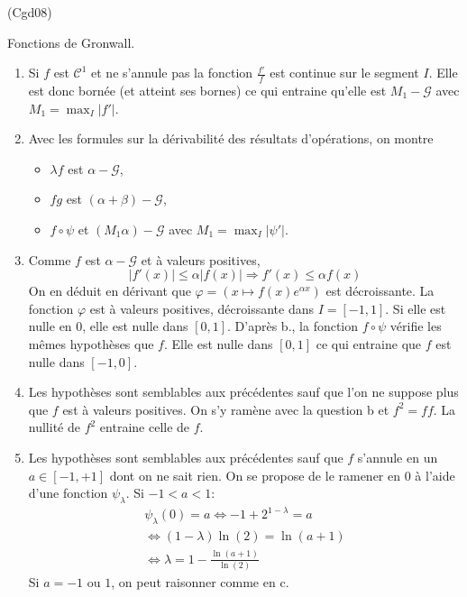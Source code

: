 \begin{tiny}(Cgd08)\end{tiny} Fonctions de Gronwall.
\begin{enumerate}
  \item Si $f$ est $\mathcal{C}^1$ et ne s'annule pas la fonction $\frac{f'}{f}$ est continue sur le segment $I$. Elle est donc bornée (et atteint ses bornes) ce qui entraine qu'elle est $M_1-\mathcal{G}$ avec $M_1 = \max_{I}|f'|$.
  \item Avec les formules sur la dérivabilité des résultats d'opérations, on montre
\begin{itemize}
 \item $\lambda f$ est $\alpha-\mathcal{G}$,
 \item $fg$ est $(\alpha + \beta)-\mathcal{G}$,
 \item $f\circ \psi$ et $(M_1\alpha)-\mathcal{G}$ avec $M_1 = \max_{I}|\psi'|$.
\end{itemize}

  \item Comme $f$ est $\alpha - \mathcal{G}$ et à valeurs positives,
\[
 |f'(x)|\leq \alpha |f(x)| \Rightarrow f'(x)\leq \alpha f(x)
\]
On en déduit en dérivant que $\varphi = \left( x\mapsto f(x)e^{\alpha x}\right) $ est décroissante. La fonction $\varphi$ est à valeurs positives, décroissante dans $I = \left[ -1,1\right] $. Si elle est nulle en $0$, elle est nulle dans $[0,1]$.\newline
D'après b., la fonction $f\circ \psi$ vérifie les mêmes hypothèses que $f$. Elle est nulle dans $[0,1]$ ce qui entraine que $f$ est nulle dans $[-1,0]$.
  \item Les hypothèses sont semblables aux précédentes sauf que l'on ne suppose plus que $f$ est à valeurs positives. On s'y ramène avec la question b et $f^2 = f f$. La nullité de $f^2$ entraine celle de $f$.
  
  \item Les hypothèses sont semblables aux précédentes sauf que $f$ s'annule en un $a\in \left[ -1, +1 \right]$ dont on ne sait rien. On se propose de le ramener en $0$ à l'aide d'une fonction $\psi_\lambda$. \newline
Si $-1 < a < 1$:
\begin{multline*}
\psi_\lambda(0) = a 
\Leftrightarrow 
-1 + 2^{1-\lambda} = a \\
\Leftrightarrow
(1-\lambda)\ln(2) = \ln(a+1)\\
\Leftrightarrow
\lambda = 1 - \frac{\ln(a+1)}{\ln(2)}
\end{multline*}
Si $a=-1$ ou $1$, on peut raisonner comme en c.
\end{enumerate}
